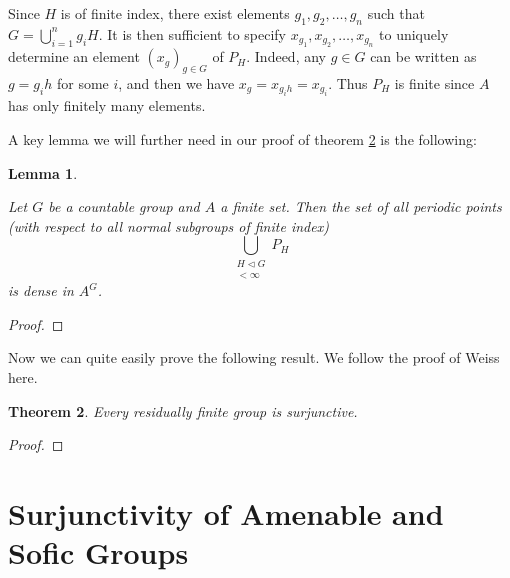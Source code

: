 \documentclass[titlepage, a4paper]{article}
\newtheorem{theorem}{Theorem}[section]
\newtheorem{lemma}[theorem]{Lemma}
\theoremstyle{remark}
\begin{document}
Since $H$ is of finite index, there exist elements $g_1, g_2, \dots, g_n$ such that $G = \bigcup_{i=1}^n g_i H$. It is then sufficient to specify $x_{g_1}, x_{g_2}, \dots, x_{g_n}$ to uniquely determine an element $(x_g)_{g \in G}$ of $P_H$. Indeed, any $g \in G$ can be written as $g = g_ih$ for some $i$, and then we have $x_g = x_{g_ih} = x_{g_i}$. Thus $P_H$ is finite since $A$ has only finitely many elements.

A key lemma we will further need in our proof of theorem \ref{thm:res_fin_surjunctive} is the following:

\begin{lemma} \label{lem:h-periodic_points}
    
Let $G$ be a countable group and $A$ a finite set. Then the set of all periodic points (with respect to all normal subgroups of finite index)
    \[
    \bigcup_{\substack{ H \triangleleft G \\ [G : H] < \infty}} P_H
    \]
is dense in $A^G$.
\end{lemma}
\begin{proof}
% 

\end{proof}

Now we can quite easily prove the following result. We follow the proof of Weiss \cite[Theorem 1.3]{weiss_2000} here.
\begin{theorem} \label{thm:res_fin_surjunctive}
    Every residually finite group is surjunctive.
\end{theorem}
\begin{proof}
    
\end{proof}

	
\section{Surjunctivity of Amenable and Sofic Groups}

\end{document}
